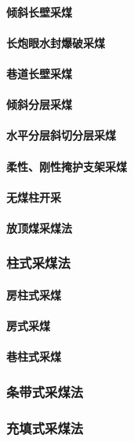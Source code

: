 \documentclass[UTF8]{../../ApplicationUniverse}
\begin{document}
            \paragraph{倾斜长壁采煤}
            \paragraph{长炮眼水封爆破采煤}
            \paragraph{巷道长壁采煤}
            \paragraph{倾斜分层采煤}
            \paragraph{水平分层斜切分层采煤}
            \paragraph{柔性、刚性掩护支架采煤}
            \paragraph{无煤柱开采}
            \paragraph{放顶煤采煤法}
        \subsubsection{柱式采煤法}
            \paragraph{房柱式采煤}
            \paragraph{房式采煤}
            \paragraph{巷柱式采煤}
        \subsubsection{条带式采煤法}
        \subsubsection{充填式采煤法}
\end{document}
